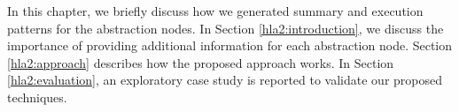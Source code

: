 \label{chapter:hla2}
In this chapter, we briefly discuss how we generated summary and execution patterns for the abstraction nodes. In Section \ref{hla2:introduction}, we discuss the importance of providing additional information for each abstraction node. Section \ref{hla2:approach} describes how the proposed approach works. In Section \ref{hla2:evaluation}, an exploratory case study is reported to validate our proposed techniques.


